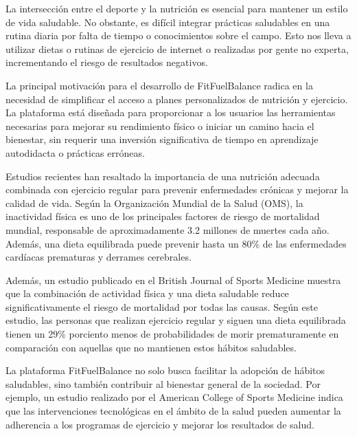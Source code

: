 La intersección entre el deporte y la nutrición es esencial para mantener un estilo de vida saludable. No obstante, es difícil integrar prácticas saludables en una rutina diaria por falta de tiempo o conocimientos sobre el campo. Esto nos lleva a utilizar dietas o rutinas de ejercicio de internet o realizadas por gente no experta, incrementando el riesgo de resultados negativos.

La principal motivación para el desarrollo de FitFuelBalance radica en la necesidad de simplificar el acceso a planes personalizados de nutrición y ejercicio. La plataforma está diseñada para proporcionar a los usuarios las herramientas necesarias para mejorar su rendimiento físico o iniciar un camino hacia el bienestar, sin requerir una inversión significativa de tiempo en aprendizaje autodidacta o prácticas erróneas.

Estudios recientes han resaltado la importancia de una nutrición adecuada combinada con ejercicio regular para prevenir enfermedades crónicas y mejorar la calidad de vida. Según la Organización Mundial de la Salud (OMS), la inactividad física es uno de los principales factores de riesgo de mortalidad mundial, responsable de aproximadamente 3.2 millones de muertes cada año. Además, una dieta equilibrada puede prevenir hasta un 80\% de las enfermedades cardíacas prematuras y derrames cerebrales.

Además, un estudio publicado en el British Journal of Sports Medicine muestra que la combinación de actividad física y una dieta saludable reduce significativamente el riesgo de mortalidad por todas las causas. Según este estudio, las personas que realizan ejercicio regular y siguen una dieta equilibrada tienen un 29\% porciento menos de probabilidades de morir prematuramente en comparación con aquellas que no mantienen estos hábitos saludables.

La plataforma FitFuelBalance no solo busca facilitar la adopción de hábitos saludables, sino también contribuir al bienestar general de la sociedad. Por ejemplo, un estudio realizado por el American College of Sports Medicine indica que las intervenciones tecnológicas en el ámbito de la salud pueden aumentar la adherencia a los programas de ejercicio y mejorar los resultados de salud.